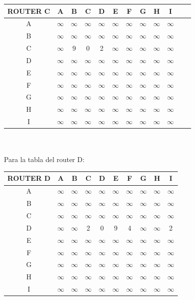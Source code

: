 \documentclass{article}
\begin{document}
\begin{tabular}{ | c | c | c | c | c | c | c | c | c | c | c | c |}
\hline                 
ROUTER C    & A      & B      & C      & D      & E      & F      & G      & H      & I      \\
\hline
        A   &$\infty$&$\infty$&$\infty$&$\infty$&$\infty$&$\infty$&$\infty$&$\infty$&$\infty$\\
\hline
        B   &$\infty$&$\infty$&$\infty$&$\infty$&$\infty$&$\infty$&$\infty$&$\infty$&$\infty$\\
\hline
        C   &$\infty$& 9      & 0      & 2      &$\infty$&$\infty$&$\infty$&$\infty$&$\infty$\\
\hline
        D   &$\infty$&$\infty$&$\infty$&$\infty$&$\infty$&$\infty$&$\infty$&$\infty$&$\infty$\\
\hline
        E   &$\infty$&$\infty$&$\infty$&$\infty$&$\infty$&$\infty$&$\infty$&$\infty$&$\infty$\\
\hline
        F   &$\infty$&$\infty$&$\infty$&$\infty$&$\infty$&$\infty$&$\infty$&$\infty$&$\infty$\\
\hline
        G   &$\infty$&$\infty$&$\infty$&$\infty$&$\infty$&$\infty$&$\infty$&$\infty$&$\infty$\\
\hline
        H   &$\infty$&$\infty$&$\infty$&$\infty$&$\infty$&$\infty$&$\infty$&$\infty$&$\infty$\\
\hline 
        I   &$\infty$&$\infty$&$\infty$&$\infty$&$\infty$&$\infty$&$\infty$&$\infty$&$\infty$\\
\hline
\end{tabular}
\\\\
Para la tabla del router D:\\
\begin{tabular}{ | c | c | c | c | c | c | c | c | c | c |}
\hline                 
ROUTER D    & A      & B      & C      & D      & E      & F      & G      & H      & I      \\
\hline
        A   &$\infty$&$\infty$&$\infty$&$\infty$&$\infty$&$\infty$&$\infty$&$\infty$&$\infty$\\
\hline
        B   &$\infty$&$\infty$&$\infty$&$\infty$&$\infty$&$\infty$&$\infty$&$\infty$&$\infty$\\
\hline
        C   &$\infty$&$\infty$&$\infty$&$\infty$&$\infty$&$\infty$&$\infty$&$\infty$&$\infty$\\
\hline
        D   &$\infty$&$\infty$& 2      & 0      & 9      & 4      &$\infty$&$\infty$& 2      \\
\hline
        E   &$\infty$&$\infty$&$\infty$&$\infty$&$\infty$&$\infty$&$\infty$&$\infty$&$\infty$\\
\hline
        F   &$\infty$&$\infty$&$\infty$&$\infty$&$\infty$&$\infty$&$\infty$&$\infty$&$\infty$\\
\hline
        G   &$\infty$&$\infty$&$\infty$&$\infty$&$\infty$&$\infty$&$\infty$&$\infty$&$\infty$\\
\hline
        H   &$\infty$&$\infty$&$\infty$&$\infty$&$\infty$&$\infty$&$\infty$&$\infty$&$\infty$\\
\hline 
        I   &$\infty$&$\infty$&$\infty$&$\infty$&$\infty$&$\infty$&$\infty$&$\infty$&$\infty$\\
\hline
\end{tabular}
\end{document}

